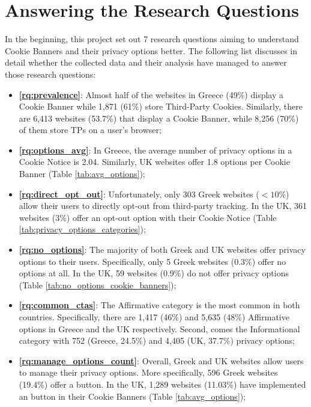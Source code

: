 \documentclass[../main.tex]{subfiles}
\begin{document}
\section{Answering the Research Questions}
In the beginning, this project set out 7 research questions aiming to understand Cookie Banners and their privacy options better. The following list discusses in detail whether the collected data and their analysis have managed to answer those research questions: 

\begin{itemize}
    \item \textbf{\ref{rq:prevalence}}: Almost half of the websites in Greece (49\%) display a Cookie Banner while 1,871 (61\%) store Third-Party Cookies. Similarly, there are 6,413 websites (53.7\%) that display a Cookie Banner, while 8,256 (70\%) of them store TPs on a user’s browser;

    \item \textbf{\ref{rq:options_avg}}: In Greece, the average number of privacy options in a Cookie Notice is 2.04. Similarly, UK websites offer 1.8 options per Cookie Banner (Table \ref{tab:avg_options});

    \item \textbf{\ref{rq:direct_opt_out}}: Unfortunately, only 303 Greek websites ($<10\%$) allow their users to directly opt-out from third-party tracking. In the UK, 361 websites (3\%) offer an opt-out option with their Cookie Notice (Table \ref{tab:privacy_options_categories});

    \item \textbf{\ref{rq:no_options}}: The majority of both Greek and UK websites offer privacy options to their users. Specifically, only 5 Greek websites (0.3\%) offer no options at all. In the UK, 59 websites (0.9\%) do not offer privacy options (Table \ref{tab:no_options_cookie_banners});

    \item \textbf{\ref{rq:common_ctas}}: The Affirmative category is the most common in both countries. Specifically, there are 1,417 (46\%) and 5,635 (48\%) Affirmative options in Greece and the UK respectively. Second, comes the Informational category with 752 (Greece, 24.5\%) and 4,405 (UK, 37.7\%) privacy options;

    \item \textbf{\ref{rq:manage_options_count}}: Overall, Greek and UK websites allow users to manage their privacy options. More specifically, 596 Greek websites (19.4\%) offer a  button. In the UK, 1,289 websites (11.03\%) have implemented an  button in their Cookie Banners (Table \ref{tab:avg_options});


\end{itemize}
\end{document}
